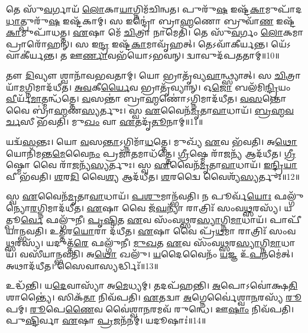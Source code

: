 𑌤𑍇 𑌸𑍁᳴\-\ul{𑌵}\-𑌰𑍍𑌗𑌾𑌯᳴ \ul{𑌲𑍋}\-𑌕𑌾\-\ul{𑌯𑌾}\-𑌗𑍍𑌨𑌿𑌮᳴𑌚𑌿𑌨𑍍𑌵𑌤।
𑌪𑍁𑌰𑍁᳴\-\ul{𑌷} 𑌇𑌷𑍍𑌟᳴\-\ul{𑌕𑌾}\-𑌮𑍁𑌪𑌾᳴𑌦\-\ul{𑌧𑌾}\-𑌤𑍍\-𑌪𑍁𑌰𑍁᳴\-\ul{𑌷} 𑌇𑌷𑍍𑌟᳴𑌕𑌾𑌮𑍍।
𑌸 𑌇𑌨𑍍𑌦𑍍𑌰𑍋॑ 𑌬𑍍𑌰𑌾\-\ul{𑌹𑍍𑌮}\-𑌣𑍋 𑌬𑍍𑌰𑍁𑌵𑌾᳴\-\ul{𑌣} 𑌇𑌷𑍍𑌟᳴\-\ul{𑌕𑌾}\-𑌮𑍁𑌪𑌾᳴𑌧𑌤𑍍𑌤।
\-\ul{𑌏}\-𑌷𑌾 𑌮𑍇᳴ \ul{𑌚𑌿}\-𑌤𑍍𑌰𑌾 𑌨𑌾𑌮𑍇𑌤𑌿᳴।
𑌤𑍇 𑌸𑍁᳴\-\ul{𑌵}\-𑌰𑍍𑌗𑌂 \ul{𑌲𑍋}\-𑌕𑌮𑌾 𑌪𑍍𑌰𑌾𑌰𑍋᳴𑌹𑌨𑍍।
𑌸 𑌇\-\ul{𑌨𑍍𑌦𑍍𑌰} 𑌇𑌷𑍍𑌟᳴\-\ul{𑌕𑌾}\-𑌮𑌾𑌵𑍃᳴𑌹𑌤𑍍।
𑌤𑍇𑌽𑌵𑌾᳴𑌕𑍀𑌰𑍍𑌯𑌨𑍍𑌤।
𑌯𑍇᳴𑌽𑌵𑌾𑌕𑍀॑𑌰𑍍𑌯𑌨𑍍𑌤।
𑌤 𑌊\-\ul{𑌰𑍍𑌣𑌾}\-𑌵𑌭᳴𑌯𑍋\-𑌽𑌭𑌵𑌨𑍍।
𑌦𑍍𑌵𑌾𑌵𑍁𑌦᳴𑌪𑌤𑌤𑌾𑌮𑍍॥10॥

𑌤𑍗 \ul{𑌦𑌿}\-𑌵𑍍𑌯𑍗 𑌶𑍍𑌵𑌾𑌨𑌾᳴𑌵𑌭𑌵𑌤𑌾𑌮𑍍।
𑌯𑍋 𑌭𑍍𑌰𑌾𑌤𑍃᳴𑌵𑍍𑌯\-\ul{𑌵𑌾}\-𑌨𑍍𑌥𑍍𑌸𑍍𑌯𑌾𑌤𑍍।
𑌸 \ul{𑌚𑌿}\-𑌤𑍍𑌰𑌾𑌯𑌾᳴\-\ul{𑌮}\-𑌗𑍍𑌨𑌿𑌮𑌾𑌦᳴𑌧𑍀𑌤।
\-\ul{𑌅}\-\-\ul{𑌵}\-𑌕𑍀\-\ul{𑌰𑍍𑌯𑍈}\-𑌵 𑌭𑍍𑌰𑌾𑌤𑍃᳴𑌵𑍍𑌯𑌾𑌨𑍍।
𑌓\-\ul{𑌜𑍋} 𑌬𑌲᳴𑌮𑌿\-\ul{𑌨𑍍𑌦𑍍𑌰𑌿}\-𑌯𑌂 \ul{𑌵𑍀}\-𑌰𑍍𑌯᳴\-\ul{𑌮𑌾}\-𑌤𑍍𑌮𑌨𑍍𑌧᳴𑌤𑍍𑌤𑍇।
\-\ul{𑌵}\-𑌸𑌨𑍍𑌤𑌾॑ 𑌬𑍍𑌰𑌾\-\ul{𑌹𑍍𑌮}\-𑌣𑍋॑\-𑌽𑌗𑍍𑌨𑌿𑌮𑌾𑌦᳴𑌧𑍀𑌤।
\-\ul{𑌵}\-\-\ul{𑌸}\-𑌨𑍍𑌤𑍋 𑌵𑍈 𑌬𑍍𑌰𑌾॑\-\ul{𑌹𑍍𑌮}\-𑌣\-\ul{𑌸𑍍𑌯}\-𑌰𑍍𑌤𑍁𑌃।
𑌸𑍍𑌵 \ul{𑌏}\-𑌵𑍈𑌨᳴\-\ul{𑌮𑍃}\-𑌤𑌾\-\ul{𑌵𑌾}\-𑌧𑌾𑌯᳴।
\-\ul{𑌬𑍍𑌰}\-\-\ul{𑌹𑍍𑌮}\-\-\ul{𑌵}\-\-\ul{𑌰𑍍𑌚}\-𑌸𑍀 𑌭᳴𑌵𑌤𑌿।
𑌮𑍁\-\ul{𑌖𑌂} 𑌵𑌾 \ul{𑌏}\-𑌤𑌦𑍃᳴\-\ul{𑌤𑍂}\-𑌨𑌾𑌮𑍍॥11॥

𑌯𑌦𑍍𑌵᳴\-\ul{𑌸}\-𑌨𑍍𑌤𑌃।
𑌯𑍋 \ul{𑌵}\-𑌸\-\ul{𑌨𑍍𑌤𑌾}\-\-𑌽𑌗𑍍𑌨𑌿𑌮𑌾᳴\-\ul{𑌧}\-𑌤𑍍𑌤𑍇।
𑌮𑍁𑌖𑍍𑌯᳴ \ul{𑌏}\-𑌵 𑌭᳴𑌵𑌤𑌿।
𑌅\-\ul{𑌥𑍋} 𑌯𑍋𑌨𑌿᳴𑌮𑌨𑍍𑌤\-\ul{𑌮𑍇}\-𑌵𑍈\-\ul{𑌨𑌂} 𑌪𑍍𑌰𑌜𑌾᳴\-\ul{𑌤}\-𑌮𑌾𑌧᳴𑌤𑍍𑌤𑍇।
\-\ul{𑌗𑍍𑌰𑍀}\-𑌷𑍍𑌮𑍇 𑌰𑌾᳴\-\ul{𑌜}\-𑌨𑍍𑌯᳴ 𑌆𑌦᳴𑌧𑍀𑌤।
\-\ul{𑌗𑍍𑌰𑍀}\-𑌷𑍍𑌮𑍋 𑌵𑍈 𑌰𑌾᳴\-\ul{𑌜}\-𑌨𑍍𑌯᳴\-\ul{𑌸𑍍𑌯}\-𑌰𑍍𑌤𑍁𑌃।
𑌸𑍍𑌵 \ul{𑌏}\-𑌵𑍈𑌨᳴\-\ul{𑌮𑍃}\-𑌤𑌾\-\ul{𑌵𑌾}\-𑌧𑌾𑌯᳴।
\-\ul{𑌇}\-\-\ul{𑌨𑍍𑌦𑍍𑌰𑌿}\-\-\ul{𑌯𑌾}\-𑌵𑍀 𑌭᳴𑌵𑌤𑌿।
\-\ul{𑌶}\-𑌰\-\ul{𑌦𑌿} 𑌵𑍈\-\ul{𑌶𑍍𑌯} 𑌆𑌦᳴𑌧𑍀𑌤।
\-\ul{𑌶}\-𑌰𑌦𑍍𑌵𑍈 𑌵𑍈𑌶𑍍𑌯᳴\-\ul{𑌸𑍍𑌯}\-𑌰𑍍𑌤𑍁𑌃॥12॥

𑌸𑍍𑌵 \ul{𑌏}\-𑌵𑍈𑌨᳴\-\ul{𑌮𑍃}\-𑌤𑌾\-\ul{𑌵𑌾}\-𑌧𑌾𑌯᳴।
\-\ul{𑌪}\-\-\ul{𑌶𑍁}\-𑌮𑌾𑌨𑍍𑌭᳴𑌵𑌤𑌿।
𑌨 𑌪𑍂𑌰𑍍𑌵᳴\-\ul{𑌯𑍋𑌃} 𑌫𑌲𑍍𑌗𑍁᳴𑌨𑍍𑌯𑍋\-\ul{𑌰}\-𑌗𑍍𑌨𑌿𑌮𑌾𑌦᳴𑌧𑍀𑌤।
\-\ul{𑌏}\-𑌷𑌾 𑌵𑍈 𑌜᳴\-\ul{𑌘}\-𑌨𑍍𑌯𑌾᳴ 𑌰𑌾𑌤𑍍𑌰𑌿𑌃᳴ 𑌸𑌂𑌵\-\ul{𑌥𑍍𑌸}\-𑌰𑌸𑍍𑌯᳴।
𑌯𑌤𑍍𑌪𑍂\-\ul{𑌰𑍍𑌵𑍇} 𑌫𑌲𑍍𑌗𑍁᳴𑌨𑍀।
\-\ul{𑌪𑍃}\-\-\ul{𑌷𑍍𑌟𑌿}\-𑌤 \ul{𑌏}\-𑌵 𑌸𑌂᳴𑌵\-\ul{𑌥𑍍𑌸}\-𑌰\-\ul{𑌸𑍍𑌯𑌾}\-𑌗𑍍𑌨𑌿\-\ul{𑌮𑌾}\-𑌧𑌾𑌯᳴।
𑌪𑌾𑌪𑍀᳴𑌯𑌾𑌨𑍍𑌭𑌵𑌤𑌿।
𑌉𑌤𑍍𑌤᳴𑌰\-\ul{𑌯𑍋}\-𑌰𑌾 𑌦᳴𑌧𑍀𑌤।
\-\ul{𑌏}\-𑌷𑌾 𑌵𑍈 𑌪𑍍𑌰᳴\-\ul{𑌥}\-𑌮𑌾 𑌰𑌾𑌤𑍍𑌰𑌿𑌃᳴ 𑌸𑌂𑌵\-\ul{𑌥𑍍𑌸}\-𑌰𑌸𑍍𑌯᳴।
𑌯𑌦𑍁𑌤𑍍𑌤᳴\-\ul{𑌰𑍇} 𑌫𑌲𑍍𑌗𑍁᳴𑌨𑍀।
\-\ul{𑌮𑍁}\-\-\ul{𑌖}\-𑌤 \ul{𑌏}\-𑌵 𑌸𑌂᳴𑌵\-\ul{𑌥𑍍𑌸}\-𑌰\-\ul{𑌸𑍍𑌯𑌾}\-𑌗𑍍𑌨𑌿\-\ul{𑌮𑌾}\-𑌧𑌾𑌯᳴।
𑌵𑌸𑍀᳴𑌯𑌾𑌨𑍍𑌭𑌵𑌤𑌿।
𑌅\-\ul{𑌥𑍋} 𑌖𑌲𑍁᳴।
\-\ul{𑌯}\-𑌦𑍈𑌵𑍈𑌨𑌂᳴ \ul{𑌯}\-𑌜𑍍𑌞 𑌉᳴\-\ul{𑌪}\-𑌨𑌮𑍇॑𑌤𑍍।
𑌅𑌥𑌾𑌦᳴𑌧𑍀𑌤।
𑌸𑍈𑌵𑌾𑌸𑍍𑌯𑌰𑍍𑌦𑍍𑌧𑌿𑌃᳴॥13॥\anuvakamend[𑌖𑌲𑍍𑌵𑌾᳴𑌧𑌿𑌥𑍍𑌸\-\ul{𑌨𑍍𑌤} 𑌫𑌲𑍍𑌗𑍁᳴𑌨𑍍𑌯𑍋\-\ul{𑌰}\-𑌗𑍍𑌨𑌿𑌮𑌾𑌦᳴𑌧𑍀𑌤𑌾𑌸𑌨𑍍𑌨𑌪𑌤𑌤𑌾𑌮𑍃\-\ul{𑌤𑍂}\-𑌨𑌾𑌂 𑌵𑍈𑌶𑍍𑌯᳴\-\ul{𑌸𑍍𑌯}\-𑌰𑍍𑌤𑍁𑌰𑍁𑌤𑍍𑌤᳴\-\ul{𑌰𑍇} 𑌫𑌲𑍍𑌗𑍁᳴\-\ul{𑌨𑍀} 𑌷𑌟𑍍𑌚᳴]

𑌉𑌦𑍍𑌧᳴𑌨𑍍𑌤𑌿।
𑌯\-\ul{𑌦𑍇}\-𑌵𑌾𑌸𑍍𑌯𑌾᳴ 𑌅\-\ul{𑌮𑍇}\-𑌧𑍍𑌯𑌮𑍍।
𑌤𑌦𑌪᳴𑌹𑌨𑍍𑌤𑌿।
\-\ul{𑌅}\-𑌪𑍋𑌽𑌵𑍋॑𑌕𑍍𑌷\-\ul{𑌤𑌿} 𑌶𑌾𑌨𑍍𑌤𑍍𑌯𑍈॑।
𑌸𑌿𑌕᳴\-\ul{𑌤𑌾} 𑌨𑌿𑌵᳴𑌪𑌤𑌿।
\-\ul{𑌏}\-𑌤𑌦𑍍𑌵𑌾 \ul{𑌅}\-𑌗𑍍𑌨𑍇𑌰𑍍𑌵𑍈॑𑌶𑍍𑌵𑌾\-\ul{𑌨}\-𑌰𑌸𑍍𑌯᳴ \ul{𑌰𑍂}\-𑌪𑌮𑍍।
\-\ul{𑌰𑍂}\-𑌪𑍇\-\ul{𑌣𑍈}\-𑌵 𑌵𑍈॑𑌶𑍍𑌵𑌾\-\ul{𑌨}\-𑌰𑌮𑌵᳴ 𑌰𑍁𑌨𑍍𑌧𑍇।
𑌊\-\ul{𑌷𑌾𑌂} 𑌨𑌿𑌵᳴𑌪𑌤𑌿।
𑌪𑍁\-\ul{𑌷𑍍𑌟𑌿}\-𑌰𑍍𑌵𑌾 \ul{𑌏}\-𑌷𑌾 \ul{𑌪𑍍𑌰}\-𑌜𑌨᳴𑌨𑌮𑍍।
𑌯𑌦𑍂𑌷𑌾𑌃॑॥14॥

